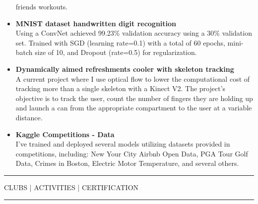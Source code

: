 \documentclass{article}
\newcommand{\makesection}[1]{\hrule\vskip1mm\uppercase{#1}\vskip1mm\hrule}
\begin{document}
\begin{itemize}[leftmargin=.35cm]
        friends workouts.
        \item \textbf{MNIST dataset handwritten digit recognition} \\
        Using a ConvNet achieved 99.23\% validation accuracy using a 30\% validation set.
        Trained with SGD (learning rate=0.1) with a total of 60 epochs, mini-batch size of 10,
        and Dropout (rate=0.5) for regularization.
        \item \textbf{Dynamically aimed refreshments cooler with skeleton tracking} \\
        A current project where I use optical flow to lower the computational cost of tracking
        more than a single skeleton with a Kinect V2. The project's objective is to track the
        user, count the number of fingers they are holding up and launch a can from the
        appropriate compartment to the user at a variable distance.
        \item \textbf{Kaggle Competitions - Data} \\
        I've trained and deployed several models utilizing datasets provided in competitions, including:
        New Your City Airbnb Open Data, PGA Tour Golf Data, Crimes in Boston, Electric Motor Temperature,
        and several others.

    \end{itemize}
    \makesection{Clubs | Activities | Certification}
\end{document}
